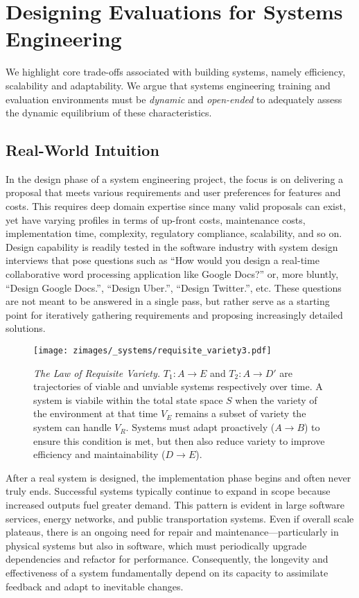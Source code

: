 \section{Designing Evaluations for Systems Engineering}
We highlight core trade-offs associated with building systems, namely efficiency, scalability and adaptability. We argue that systems engineering training and evaluation environments must be \textit{dynamic} and \textit{open-ended} to adequately assess the dynamic equilibrium of these characteristics.

\subsection{Real-World Intuition}
In the design phase of a system engineering project, the focus is on delivering a proposal that meets various requirements and user preferences for features and costs. This requires deep domain expertise since many valid proposals can exist, yet have varying profiles in terms of up-front costs, maintenance costs, implementation time, complexity, regulatory compliance, scalability, and so on. Design capability is readily tested in the software industry with system design interviews that pose questions such as “How would you design a real-time collaborative word processing application like Google Docs?” or, more bluntly, “Design Google Docs.”, “Design Uber.”, “Design Twitter.”, etc. These questions are not meant to be answered in a single pass, but rather serve as a starting point for iteratively gathering requirements and proposing increasingly detailed solutions.

\begin{figure}[ht]
    \centering
    \texttt{[image: zimages/\_systems/requisite\_variety3.pdf]}
    \caption{\textit{The Law of Requisite Variety.} $T_1: A \rightarrow E$ and $T_2: A \rightarrow D\prime$ are trajectories of viable and unviable systems respectively over time. A system is viabile within the total state space $S$ when the variety of the environment at that time $V_E$ remains a subset of variety the system can handle $V_R$. Systems must adapt proactively ($A \rightarrow B$) to ensure this condition is met, but then also reduce variety to improve efficiency and maintainability ($D\rightarrow E$).}
    \label{fig:requisite_variety}
\end{figure}

After a real system is designed, the implementation phase begins and often never truly ends. Successful systems typically continue to expand in scope because increased outputs fuel greater demand. This pattern is evident in large software services, energy networks, and public transportation systems. Even if overall scale plateaus, there is an ongoing need for repair and maintenance—particularly in physical systems but also in software, which must periodically upgrade dependencies and refactor for performance.  Consequently, the longevity and effectiveness of a system fundamentally depend on its capacity to assimilate feedback and adapt to inevitable changes.

